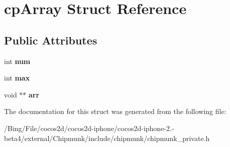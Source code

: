 \hypertarget{structcp_array}{\section{cp\-Array Struct Reference}
\label{structcp_array}
}
\subsection*{Public Attributes}
\begin{DoxyCompactItemize}
\item 
\hypertarget{structcp_array_a7e4b3a68ae2f403be9cfdac83f1059e5}{int {\bfseries num}}\label{structcp_array_a7e4b3a68ae2f403be9cfdac83f1059e5}

\item 
\hypertarget{structcp_array_af716e2d8fd33cdb3278b123b6f5479e2}{int {\bfseries max}}\label{structcp_array_af716e2d8fd33cdb3278b123b6f5479e2}

\item 
\hypertarget{structcp_array_a2a69d85aa1cd455427b7df267d7d6ed5}{void $\ast$$\ast$ {\bfseries arr}}\label{structcp_array_a2a69d85aa1cd455427b7df267d7d6ed5}

\end{DoxyCompactItemize}


The documentation for this struct was generated from the following file\-:\begin{DoxyCompactItemize}
\item 
/\-Bing/\-File/cocos2d/cocos2d-\/iphone/cocos2d-\/iphone-\/2.-\/beta4/external/\-Chipmunk/include/chipmunk/chipmunk\-\_\-private.\-h\end{DoxyCompactItemize}
